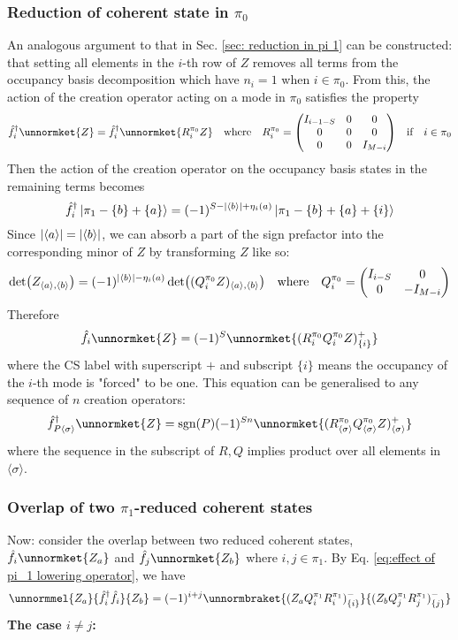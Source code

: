 \documentclass[12pt]{article}
\newcommand{\sgn}{\text{sgn}}
\newcommand{\seq}[1]{\langle #1\rangle}
\newcommand{\hc}{^\dagger}
\begin{document}
	\subsubsection{Reduction of coherent state in $\pi_0$}
	An analogous argument to that in Sec. \ref{sec: reduction in pi 1} can be constructed: that setting all elements in the $i$-th row of $Z$ removes all terms from the occupancy basis decomposition which have $n_i=1$ when $i\in\pi_0$. From this, the action of the creation operator acting on a mode in $\pi_0$ satisfies the property
	\begin{equation}
	\hat{f}\hc_i\unnormket{Z}=\hat{f}\hc_i\unnormket{R^{\pi_0}_iZ}\qq{where}R^{\pi_0}_i=\mqty(\dmat[0]{I_{i-1-S}, 0, I_{M-i}})\qq{if}i\in\pi_0
	\end{equation}
	Then the action of the creation operator on the occupancy basis states in the remaining terms becomes
	\begin{equation}
	\hat{f}\hc_i\ket{\pi_1-\{b\}+\{a\}}=(-1)^{S-\abs{\seq{b}}+\eta_i(a)}\ket{\pi_1-\{b\}+\{a\}+\{i\}}
	\end{equation}
	Since $\abs{\seq{a}}=\abs{\seq{b}}$, we can absorb a part of the sign prefactor into the corresponding minor of $Z$ by transforming $Z$ like so:
	\begin{equation}
	\det(Z_{\seq{a},\seq{b}})=(-1)^{\abs{\seq{b}}-\eta_i(a)}\det((Q^{\pi_0}_iZ)_{\seq{a},\seq{b}})\qq{where}Q^{\pi_0}_i=\mqty(\dmat[0]{I_{i-S}, -I_{M-i}})
	\end{equation}
	Therefore
	\begin{equation}
	\hat{f}_i\unnormket{Z}=(-1)^{S}\unnormket{(R^{\pi_0}_iQ^{\pi_0}_iZ)^+_{\{i\}}}
	\end{equation}
	where the CS label with superscript $+$ and subscript $\{i\}$ means the occupancy of the $i$-th mode is "forced" to be one. This equation can be generalised to any sequence of $n$ creation operators:
	\begin{equation}
	\hat{f}\hc_{P\seq{\sigma}}\unnormket{Z}=\sgn(P)(-1)^{Sn}\unnormket{(R^{\pi_0}_{\seq{\sigma}}Q^{\pi_0}_{\seq{\sigma}}Z)^{+}_{\seq{\sigma}}}
	\end{equation}
	where the sequence in the subscript of $R, Q$ implies product over all elements in $\seq{\sigma}$.
	
	\subsubsection{Overlap of two $\pi_1$-reduced coherent states}
	Now: consider the overlap between two reduced coherent states, $\hat{f}_i\unnormket{Z_a}$ and $\hat{f}_j\unnormket{Z_b}$ where $i,j\in \pi_1$. By Eq. \ref{eq:effect of pi_1 lowering operator}, we have
	\begin{equation}
	\unnormmel{Z_a}{\hat{f}\hc_i\hat{f}_i}{Z_b}=(-1)^{i+j}\unnormbraket{(Z_aQ^{\pi_1}_iR^{\pi_1}_i)^{-}_{\{i\}}}{(Z_bQ^{\pi_1}_jR^{\pi_1}_j)^{-}_{\{j\}}}
	\end{equation}
	\textbf{The case $i\neq j$:}
	
\end{document}

